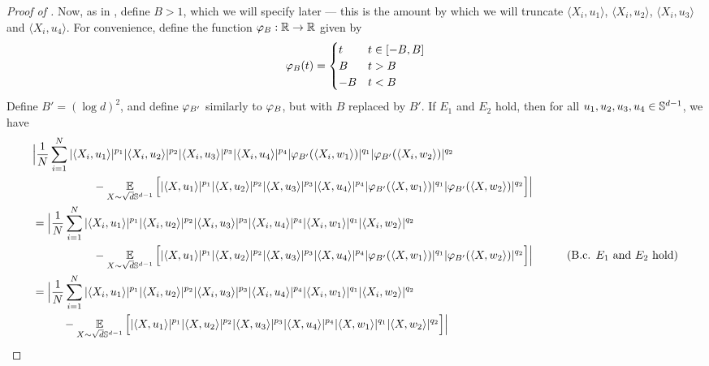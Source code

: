 \begin{proof}[Proof of ]
Now, as in \citet{ALPT2009_concentration}, define $B > 1$, which we will specify later --- this is the amount by which we will truncate $\langle X_i, u_1 \rangle$, $\langle X_i, u_2 \rangle$, $\langle X_i, u_3 \rangle$ and $\langle X_i, u_4 \rangle$. For convenience, define the function ${\varphi_B}: \mathbb{R} \to \mathbb{R}$ given by
\begin{align} \label{eq:truncB_def}
{\varphi_B}(t)
= \begin{cases}
t & t \in [-B, B] \\
B & t > B \\
-B & t < B
\end{cases}
\end{align}
Define $B' = (\log d)^2$, and define ${\varphi_{B'}}$ similarly to ${\varphi_B}$, but with $B$ replaced by $B'$. If $E_1$ and $E_2$ hold, then for all $u_1, u_2, u_3, u_4 \in \mathbb{S}^{d - 1}$, we have
\begin{align} \label{eq:final_quantity}
& \Big|\frac{1}{N} \sum_{i = 1}^N |\langle X_i, u_1 \rangle|^{p_1} |\langle X_i, u_2 \rangle|^{p_2} |\langle X_i, u_3 \rangle|^{p_3} |\langle X_i, u_4 \rangle|^{p_4} |\truncBprime(\langle X_i, w_1 \rangle)|^{q_1} |\truncBprime(\langle X_i, w_2 \rangle)|^{q_2} \\
& \nextlinespace\nextlinespace - \E_{X \sim \sqrt{d} \bbS^{d - 1}} \Big[|\langle X, u_1 \rangle|^{p_1} |\langle X, u_2 \rangle|^{p_2} |\langle X, u_3 \rangle|^{p_3} |\langle X, u_4 \rangle|^{p_4} |\truncBprime(\langle X, w_1 \rangle)|^{q_1} |\truncBprime(\langle X, w_2 \rangle)|^{q_2} \Big] \Big| \\
& = \Big|\frac{1}{N} \sum_{i = 1}^N |\langle X_i, u_1 \rangle|^{p_1} |\langle X_i, u_2 \rangle|^{p_2} |\langle X_i, u_3 \rangle|^{p_3} |\langle X_i, u_4 \rangle|^{p_4} |\langle X_i, w_1 \rangle|^{q_1} |\langle X_i, w_2 \rangle|^{q_2} \\
& \nextlinespace\nextlinespace - \E_{X \sim \sqrt{d} \bbS^{d - 1}} \Big[|\langle X, u_1 \rangle|^{p_1} |\langle X, u_2 \rangle|^{p_2} |\langle X, u_3 \rangle|^{p_3} |\langle X, u_4 \rangle|^{p_4} |\truncBprime(\langle X, w_1 \rangle)|^{q_1} |\truncBprime(\langle X, w_2 \rangle)|^{q_2} \Big] \Big| 
& \tag{B.c. $E_1$ and $E_2$ hold} \\
& = \Big|\frac{1}{N} \sum_{i = 1}^N |\langle X_i, u_1 \rangle|^{p_1} |\langle X_i, u_2 \rangle|^{p_2} |\langle X_i, u_3 \rangle|^{p_3} |\langle X_i, u_4 \rangle|^{p_4} |\langle X_i, w_1 \rangle|^{q_1} |\langle X_i, w_2 \rangle|^{q_2} \\
& \nextlinespace - \E_{X \sim \sqrt{d} \bbS^{d - 1}} \Big[|\langle X, u_1 \rangle|^{p_1} |\langle X, u_2 \rangle|^{p_2} |\langle X, u_3 \rangle|^{p_3} |\langle X, u_4 \rangle|^{p_4} |\langle X, w_1 \rangle|^{q_1} |\langle X, w_2 \rangle|^{q_2} \Big] \Big| \\

\end{align}
\end{proof}
